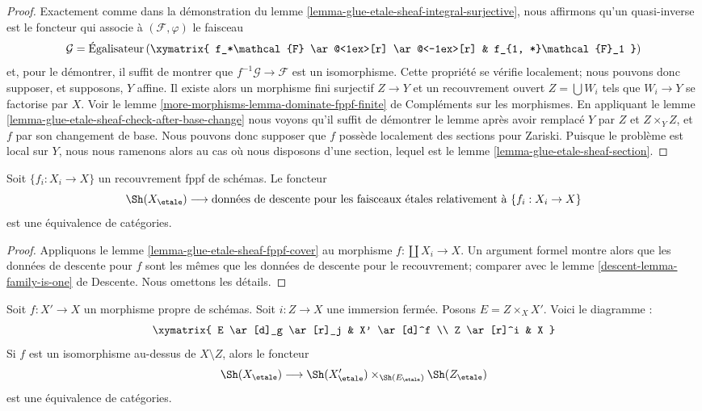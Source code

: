 \begin{proof}
Exactement comme dans la démonstration du
lemme \ref{lemma-glue-etale-sheaf-integral-surjective},
nous affirmons qu'un quasi-inverse est le foncteur qui associe
à $(\mathcal{F}, \varphi)$ le faisceau
$$
\mathcal{G} =
\text{Égalisateur}\left(
\xymatrix{
f_*\mathcal{F}
\ar@<1ex>[r] \ar@<-1ex>[r] &
f_{1, *}\mathcal{F}_1
}
\right)
$$
et, pour le démontrer, il suffit de montrer que
$f^{-1}\mathcal{G} \to \mathcal{F}$ est un isomorphisme.
Cette propriété se vérifie localement; nous pouvons donc supposer, et supposons, $Y$
affine. Il existe alors un morphisme fini surjectif
$Z \to Y$ et un recouvrement ouvert
$Z = \bigcup W_i$ tels que $W_i \to Y$ se factorise par $X$.
Voir le
lemme \ref{more-morphisms-lemma-dominate-fppf-finite} de Compléments sur les morphismes.
En appliquant le lemme
\ref{lemma-glue-etale-sheaf-check-after-base-change}
nous voyons qu'il suffit de démontrer
le lemme après avoir remplacé $Y$ par $Z$ et $Z \times_Y Z$, et $f$
par son changement de base. Nous pouvons donc supposer que $f$ possède localement des sections pour Zariski.
Puisque le problème est local sur $Y$, nous nous ramenons alors
au cas où nous disposons d'une section, lequel est le
lemme \ref{lemma-glue-etale-sheaf-section}.
\end{proof}

\begin{lemma}
\label{lemma-glue-etale-sheaf-fppf}
Soit $\{f_i : X_i \to X\}$ un recouvrement fppf de schémas.
Le foncteur
$$
\Sh(X_\etale)
\longrightarrow
\text{données de descente pour les faisceaux étales relativement à }\{f_i : X_i \to X\}
$$
est une équivalence de catégories.
\end{lemma}

\begin{proof}
Appliquons le lemme \ref{lemma-glue-etale-sheaf-fppf-cover}
au morphisme $f : \coprod X_i \to X$.
Un argument formel montre alors que les données de descente pour $f$
sont les mêmes que les données de descente pour le recouvrement; comparer
avec le lemme \ref{descent-lemma-family-is-one} de Descente.
Nous omettons les détails.
\end{proof}

\begin{lemma}
\label{lemma-glue-etale-sheaf-modification}
Soit $f : X' \to X$ un morphisme propre de schémas. Soit $i : Z \to X$
une immersion fermée. Posons $E = Z \times_X X'$. Voici le diagramme :
$$
\xymatrix{
E \ar[d]_g \ar[r]_j & X' \ar[d]^f \\
Z \ar[r]^i & X
}
$$
Si $f$ est un isomorphisme au-dessus de $X \setminus Z$, alors le foncteur
$$
\Sh(X_\etale)
\longrightarrow
\Sh(X'_\etale) \times_{\Sh(E_\etale)} \Sh(Z_\etale)
$$
est une équivalence de catégories.
\end{lemma}

